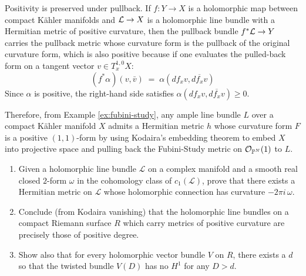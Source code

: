 \documentclass[12pt]{article}
\begin{document}
\begin{example}
Positivity is preserved under pullback. If $f:Y\to X$ is a holomorphic map
between compact Kähler manifolds and ${\mathcal{L}}\to X$ is a holomorphic line
bundle with a Hermitian metric of positive curvature, then the pullback
bundle $f^*{\mathcal{L}}\to Y$ carries the pullback metric whose curvature form is
the pullback of the original curvature form, which is also positive because
if one evaluates the pulled-back form on a tangent vector $v \in T_x^{1,0}X$:
\[(f^*\alpha)(v,\bar v) \;=\; \alpha(df_x v, \overline{df_x v})\]
Since $\alpha$ is positive, the right-hand side satisfies
$\alpha(df_x v, \overline{df_x v}) \ge 0$.


Therefore, from Example \ref{ex:fubini-study}, any ample line bundle $L$ over a compact Kähler manifold $X$ admits a Hermitian metric $h$ whose curvature form
$F$ is a positive $(1,1)$-form by using Kodaira's embedding theorem to
embed $X$ into projective space and pulling back the Fubini-Study metric on
${\mathcal{O}}_{\mathbb{P}^N}(1)$ to $L$.
\end{example}

\begin{exercise}
    \leavevmode
\begin{enumerate}
  \item Given a holomorphic line bundle $\mathcal{L}$ on a complex manifold and a
smooth real closed $2$-form $\omega$ in the cohomology class of
$c_1(\mathcal{L})$, prove that there exists a Hermitian metric on
$\mathcal{L}$ whose holomorphic connection has curvature $-2\pi i\,\omega$.

\item Conclude (from Kodaira vanishing) that the holomorphic line bundles on a
compact Riemann surface $R$ which carry metrics of positive curvature are
precisely those of positive degree.

\item Show also that for every holomorphic vector bundle $V$ on $R$, there exists
a $d$ so that the twisted bundle $V(D)$ has no $H^1$ for any $D>d$.
\end{enumerate}
\end{exercise}
\end{document}
